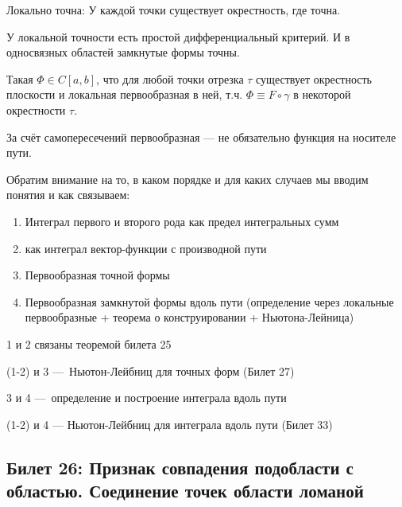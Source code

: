 \documentclass[12pt, a4paper, oneside]{memoir}
\begin{document}
\begin{definition}
    Локально точна: У каждой точки существует окрестность, где точна.
\end{definition}

У локальной точности есть простой дифференциальный критерий.
И в односвязных областей замкнутые формы точны.

\begin{definition}

    Такая $\Phi \in C[a, b]$, что для любой точки отрезка $\tau$ 
    существует окрестность плоскости и локальная первообразная в ней, 
    т.ч. $\Phi \equiv F \circ \gamma$ в некоторой окрестности $\tau$.
\end{definition}

\begin{remark}
    За счёт самопересечений первообразная — не обязательно функция на носителе пути.
\end{remark}

\begin{remark}
    Обратим внимание на то, в каком порядке и для каких случаев мы вводим понятия и как связываем:

    \begin{enumerate}
        \item Интеграл первого и второго рода как предел интегральных сумм
        \item \ditto как интеграл вектор-функции с производной пути 
        \item Первообразная точной формы
        \item Первообразная замкнутой формы вдоль пути (определение через локальные первообразные + теорема о конструировании + Ньютона-Лейница)
    \end{enumerate}
    
    1 и 2 связаны теоремой билета 25
    
    (1-2) и 3 — Ньютон-Лейбниц для точных форм (Билет 27)
        
    3 и 4 — определение и построение интеграла вдоль пути
    
    (1-2) и 4 — Ньютон-Лейбниц для интеграла вдоль пути (Билет 33)
\end{remark}


\subsection{Билет 26: Признак совпадения подобласти с областью. Соединение точек области ломаной}
\end{document}
